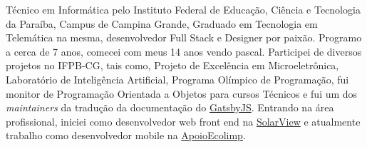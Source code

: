 \begin{cvletter}
  Técnico em Informática pelo Instituto Federal de Educação, Ciência e Tecnologia da Paraíba, Campus de Campina Grande, Graduado em Tecnologia em Telemática na mesma, desenvolvedor Full Stack e Designer por paixão. Programo a cerca de 7 anos, comecei com meus 14 anos vendo pascal. Participei de diversos projetos no IFPB-CG, tais como, Projeto de Excelência em Microeletrônica, Laboratório de Inteligência Artificial, Programa Olímpico de Programação, fui monitor de Programação Orientada a Objetos para cursos Técnicos e fui um dos \textit{maintainers} da tradução da documentação do \href{https://www.gatsbyjs.org/}{GatsbyJS}. Entrando na área profissional, iniciei como desenvolvedor web front end na \href{https://solarview.com.br/}{SolarView} e atualmente trabalho como desenvolvedor mobile na \href{https://apoioecolimp.com/}{ApoioEcolimp}.

\end{cvletter}